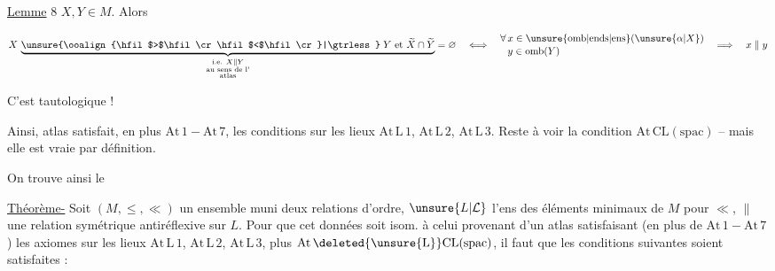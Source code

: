 
\uline{Lemme} 8  $X,Y\in M$. Alors

\[
X\,\underbrace{\mathrel{\unsure{\ooalign{\hfil$>$\hfil\cr\hfil$<$\hfil\cr}|\gtrless}}Y
  \text{ et }\widetilde X\cap\widetilde Y}
 _{\substack{\text{i.e. }X\parallel Y\\\text{au sens de l'}\\\text{atlas}}}=\varnothing
\quad\Longleftrightarrow\quad
\begin{aligned}
 &\forall\,x\in\unsure{\mathrm{omb}|\mathrm{ends}|\mathrm{ens}}(\unsure{\alpha|X})\\[-2pt]
 &\phantom{\forall\,}y\in\mathrm{omb}(Y)
\end{aligned}
\quad\Longrightarrow\quad x\parallel y
\]

C'est tautologique !

 Ainsi,  atlas satisfait, en plus  $\mathrm{At\,1}-\mathrm{At\,7}$, les conditions sur les lieux $\mathrm{At\,L\,1}$, $\mathrm{At\,L\,2}$, $\mathrm{At\,L\,3}$. Reste à voir la condition $\mathrm{At\,CL(spac)}$ -- mais elle est vraie par définition.

On trouve ainsi le

\uline{Théorème-} Soit $(M,{\leq},{\ll})$ un ensemble muni  deux relations d'ordre, $\unsure{L|\mathcal L}$ l'ens des éléments minimaux de $M$ pour $\ll$, $\parallel$ une relation symétrique antiréflexive sur $L$. Pour que cet  données  soit isom. à celui provenant d'un atlas  satisfaisant  (en plus de $\mathrm{At\,1}-\mathrm{At\,7}$) les axiomes sur les lieux $\mathrm{At\,L\,1}$, $\mathrm{At\,L\,2}$, $\mathrm{At\,L\,3}$, plus $\mathrm{At\,\deleted{\unsure{L}}CL(spac)}$, il faut  que les conditions suivantes soient satisfaites :

